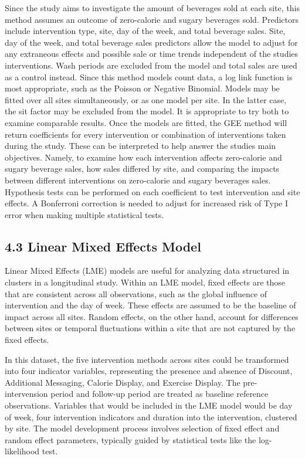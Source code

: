 \documentclass[
]{article}
\begin{document}
Since the study aims to investigate the amount of beverages sold at each site, this method assumes an outcome of zero-calorie and sugary beverages sold. Predictors include intervention type, site, day of the week, and total beverage sales. Site, day of the week, and total beverage sales predictors allow the model to adjust for any extraneous effects and possible sale or time trends independent of the studies interventions. Wash periods are excluded from the model and total sales are used as a control instead. Since this method models count data, a log link function is most appropriate, such as the Poisson or Negative Binomial. Models may be fitted over all sites simultaneously, or as one model per site. In the latter case, the sit factor may be excluded from the model. It is appropriate to try both to examine comparable results. Once the models are fitted, the GEE method will return coefficients for every intervention or combination of interventions taken during the study. These can be interpreted to help answer the studies main objectives. Namely, to examine how each intervention affects zero-calorie and sugary beverage sales, how sales differed by site, and comparing the impacts between different interventions on zero-calorie and sugary beverages sales. Hypothesis tests can be performed on each coefficient to test intervention and site effects. A Bonferroni correction is needed to adjust for increased risk of Type I error when making multiple statistical tests.

\hypertarget{linear-mixed-effects-model}{%
\subsection{4.3 Linear Mixed Effects Model}\label{linear-mixed-effects-model}}

Linear Mixed Effects (LME) models are useful for analyzing data structured in clusters in a longitudinal study. Within an LME model, fixed effects are those that are consistent across all observations, such as the global influence of intervention and the day of week. These effects are assumed to be the baseline of impact across all sites. Random effects, on the other hand, account for differences between sites or temporal fluctuations within a site that are not captured by the fixed effects.

In this dataset, the five intervention methods across sites could be transformed into four indicator variables, representing the presence and absence of Discount, Additional Messaging, Calorie Display, and Exercise Display. The pre-intervension period and follow-up period are treated as baseline reference observations. Variables that would be included in the LME model would be day of week, four intervention indicators and duration into the intervention, clustered by site. The model development process involves selection of fixed effect and random effect parameters, typically guided by statistical tests like the log-likelihood test.
\end{document}
